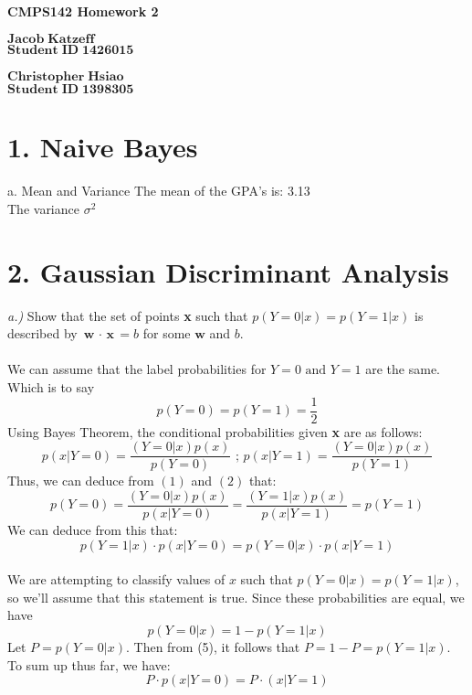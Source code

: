 \documentclass[11pt]{article}
\begin{document}
\begin{center}
{\bf\Large CMPS142 Homework 2}
\end{center}
\noindent $\mathbf{Jacob\;Katzeff}$\\
\noindent $\mathbf{Student\;ID\;1426015}$\\
\\
\noindent $\mathbf{Christopher\;Hsiao}$\\
\noindent $\mathbf{Student\;ID\;1398305}$\\

\section*{1. Naive Bayes}
\noindent a. Mean and Variance 
The mean of the GPA's is: 3.13\\
\indent The variance $\sigma^2$


\section*{2. Gaussian Discriminant Analysis}
\noindent \textit{a.)} Show that the set of points \textbf{x} such that $p(Y = 0 | x) = p(Y = 1 | x )$ is described by $\textbf{w $\cdot$ x} = b$ for some $\textbf{w}$ and $b$.\\ \\
We can assume that the label probabilities for $Y = 0 \text{ and } Y = 1$ are the same. Which is to say
\begin{equation}p(Y = 0) = p(Y = 1) = \frac{1}{2}\end{equation}
Using Bayes Theorem, the conditional probabilities given \textbf{x} are as follows:
\begin{equation}p(x | Y = 0) = \frac{(Y = 0 | x)p(x)}{p(Y = 0)} \text{ ;   } p(x | Y = 1) = \frac{(Y = 0 | x)p(x)}{p(Y = 1)}\end{equation}
Thus, we can deduce from $(1)$ and $(2)$ that:
\begin{equation}p(Y = 0) = \frac{(Y = 0 | x)p(x)}{p(x | Y = 0)} = \frac{(Y = 1 | x)p(x)}{p(x | Y = 1)} = p(Y=1)\end{equation}
We can deduce from this that:
\begin{equation}p(Y = 1 | x) \cdot p(x | Y=0) = p(Y = 0 | x) \cdot p(x | Y=1)\end{equation}
\\
We are attempting to classify values of $x$ such that $p(Y = 0 | x) = p(Y = 1 | x)$, so we'll assume that this statement is true.
Since these probabilities are equal, we have 
\begin{equation}p(Y = 0 | x) = 1 - p(Y = 1 | x)\end{equation}
Let $P = p(Y = 0|x)$. Then from (5), it follows that $P = 1 - P = p(Y = 1 | x)$.\\
To sum up thus far, we have:
\begin{equation}P \cdot p(x | Y = 0) =  P \cdot (x | Y = 1)\end{equation}
\end{document}
